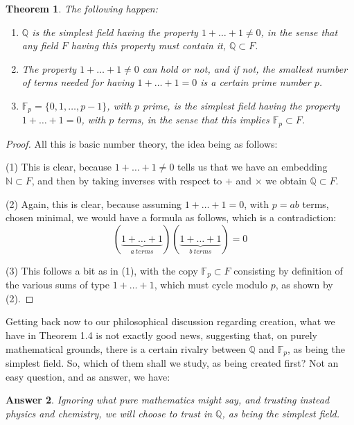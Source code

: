 \documentclass[12pt]{amsbook}
\newtheorem{theorem}{Theorem}[chapter]
\newtheorem{answer}[theorem]{Answer}
\begin{document}
\begin{theorem}
The following happen:
\begin{enumerate}
\item $\mathbb Q$ is the simplest field having the property $1+\ldots+1\neq0$, in the sense that any field $F$ having this property must contain it, $\mathbb Q\subset F$.

\item The property $1+\ldots+1\neq0$ can hold or not, and if not, the smallest number of terms needed for having $1+\ldots+1=0$ is a certain prime number $p$.

\item $\mathbb F_p=\{0,1,\ldots,p-1\}$, with $p$ prime, is the simplest field having the property $1+\ldots+1=0$, with $p$ terms, in the sense that this implies $\mathbb F_p\subset F$.
\end{enumerate}
\end{theorem}

\begin{proof}
All this is basic number theory, the idea being as follows:

\medskip

(1) This is clear, because $1+\ldots+1\neq0$ tells us that we have an embedding $\mathbb N\subset F$, and then by taking inverses with respect to $+$ and $\times$ we obtain $\mathbb Q\subset F$. 

\medskip

(2) Again, this is clear, because assuming $1+\ldots+1=0$, with $p=ab$ terms, chosen minimal, we would have a formula as follows, which is a contradiction:
$$(\underbrace{1+\ldots+1}_{a\ terms})(\underbrace{1+\ldots+1}_{b\ terms})=0$$

(3) This follows a bit as in (1), with the copy $\mathbb F_p\subset F$ consisting by definition of the various sums of type $1+\ldots+1$, which must cycle modulo $p$, as shown by (2).
\end{proof}

Getting back now to our philosophical discussion regarding creation, what we have in Theorem 1.4 is not exactly good news, suggesting that, on purely mathematical grounds, there is a certain rivalry between $\mathbb Q$ and $\mathbb F_p$, as being the simplest field. So, which of them shall we study, as being created first? Not an easy question, and as answer, we have:

\begin{answer}
Ignoring what pure mathematics might say, and trusting instead physics and chemistry, we will choose to trust in $\mathbb Q$, as being the simplest field.
\end{answer}
\end{document}
